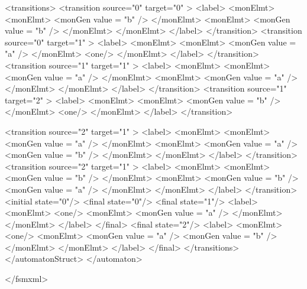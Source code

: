 \newpage

{\footnotesize
\begin{listingcont}
    <transitions>
      <transition  source="0"  target="0" >
	<label>
	  <monElmt>
	    <monElmt>
	      <monGen  value = "b" />
	    </monElmt>
	    <monElmt>
	      <monGen  value = "b" />
	    </monElmt>
	  </monElmt>
        </label>
      </transition>
      <transition  source="0"  target="1" >
        <label>
	  <monElmt>
	    <monElmt>
	      <monGen  value = "a" />
	    </monElmt>
	    <one/>
	  </monElmt>
        </label>
      </transition>
      <transition  source="1"  target="1" >
        <label>
	  <monElmt>
	    <monElmt>
	      <monGen  value = "a" />
	    </monElmt>
	    <monElmt>
	      <monGen  value = "a" />
	    </monElmt>
	  </monElmt>
        </label>
      </transition>
      <transition  source="1"  target="2" >
        <label>
	  <monElmt>
	    <monElmt>
	      <monGen  value = "b" />
	    </monElmt>
	    <one/>
	  </monElmt>
        </label>
      </transition>
\end{listingcont}
}

\newpage
\enlargethispage*{2ex}
{\footnotesize
\begin{listingcont}
      <transition  source="2"  target="1" >
        <label>
	  <monElmt>
	    <monElmt>
	      <monGen  value = "a" />
	    </monElmt>
	    <monElmt>
	      <monGen  value = "a" />
	      <monGen  value = "b" />
	    </monElmt>
	  </monElmt>
        </label>
      </transition>
      <transition  source="2"  target="1" >
        <label>
	  <monElmt>
	    <monElmt>
	      <monGen  value = "b" />
	    </monElmt>
	    <monElmt>
	      <monGen  value = "b" />
	      <monGen  value = "a" />
	    </monElmt>
	  </monElmt>
        </label>
      </transition>
      <initial state="0"/>
      <final   state="0"/>
      <final   state="1"/>
        <label>
	  <monElmt>
	    <one/>
	    <monElmt>
	      <monGen  value = "a" />
	    </monElmt>
	  </monElmt>
        </label>
      </final>
      <final   state="2"/>
        <label>
	  <monElmt>
	    <one/>
	    <monElmt>
	      <monGen  value = "a" />
	      <monGen  value = "b" />
	    </monElmt>
	  </monElmt>
        </label>
      </final>
    </transitions>
  </automatonStruct>
</automaton>

</fsmxml>
\end{listingcont}
}

\clearpage
